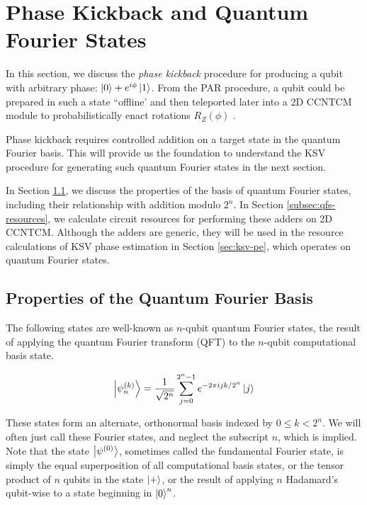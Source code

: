\section{Phase Kickback and Quantum Fourier States}
\label{sec:qfs}

In this section, we discuss the \emph{phase kickback} procedure for
producing a qubit with arbitrary phase: $\left\vert{0}\right\rangle + e^{i\phi}\left\vert{1}\right\rangle$.
From the PAR procedure, a qubit could be prepared in such a state
``offline' and then teleported later into a \textsf{2D CCNTCM} module to
probabilistically enact rotations $R_Z(\phi)$ \cite{Jones2011}.

Phase kickback requires controlled addition on a target state in 
the quantum Fourier basis. This will provide us the foundation
to understand the KSV procedure for generating such quantum Fourier
states in the next section.

In Section \ref{subsec:qfs-basis}, we discuss the properties of the
basis of quantum Fourier states, including their relationship with
addition modulo $2^n$. In Section \ref{subsec:qfs-resources},
we calculate circuit resources for performing these adders
on \textsf{2D CCNTCM}. Although the adders are generic, they will be
used in the resource calculations of KSV phase estimation in
Section \ref{sec:ksv-pe}, which operates on quantum Fourier states.

\subsection{Properties of the Quantum Fourier Basis}
\label{subsec:qfs-basis}

The following states are well-known as $n$-qubit quantum Fourier states,
the result of applying the quantum Fourier transform (QFT)
to the $n$-qubit computational basis state. 

\begin{equation}
\left\vert{\psi^{(k)}_{n}}\right\rangle = \frac{1}{\sqrt{2^n}} \sum_{j=0}^{2^n-1}
e^{-2\pi i j k / 2^n} \left\vert{j}\right\rangle
\end{equation}

These states form an alternate, orthonormal basis indexed by
$0 \le k < 2^n$. We will often just call these Fourier states,
and neglect the subscript $n$, which is implied.
Note that the state $\left\vert{\psi^{(0)}}\right\rangle$, sometimes
called the fundamental Fourier state, is simply the equal superposition
of all computational basis states, or the tensor product of
$n$ qubits in the state $\left\vert{+}\right\rangle$, or the result of applying
$n$ Hadamard's qubit-wise to a state beginning in $\left\vert{0}\right\rangle^n$.

